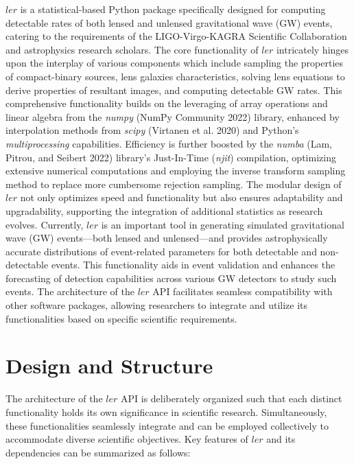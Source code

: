 \documentclass[10pt,a4paper,onecolumn]{article}
\begin{document}
\(ler\) is a statistical-based Python package specifically designed for
computing detectable rates of both lensed and unlensed gravitational
wave (GW) events, catering to the requirements of the LIGO-Virgo-KAGRA
Scientific Collaboration and astrophysics research scholars. The core
functionality of \(ler\) intricately hinges upon the interplay of
various components which include sampling the properties of
compact-binary sources, lens galaxies characteristics, solving lens
equations to derive properties of resultant images, and computing
detectable GW rates. This comprehensive functionality builds on the
leveraging of array operations and linear algebra from the \emph{numpy}
(NumPy Community 2022) library, enhanced by interpolation methods from
\emph{scipy} (Virtanen et al. 2020) and Python's \emph{multiprocessing}
capabilities. Efficiency is further boosted by the \emph{numba} (Lam,
Pitrou, and Seibert 2022) library's Just-In-Time (\emph{njit})
compilation, optimizing extensive numerical computations and employing
the inverse transform sampling method to replace more cumbersome
rejection sampling. The modular design of \(ler\) not only optimizes
speed and functionality but also ensures adaptability and upgradability,
supporting the integration of additional statistics as research evolves.
Currently, \(ler\) is an important tool in generating simulated
gravitational wave (GW) events---both lensed and unlensed---and provides
astrophysically accurate distributions of event-related parameters for
both detectable and non-detectable events. This functionality aids in
event validation and enhances the forecasting of detection capabilities
across various GW detectors to study such events. The architecture of
the \(ler\) API facilitates seamless compatibility with other software
packages, allowing researchers to integrate and utilize its
functionalities based on specific scientific requirements.

\section{Design and Structure}\label{design-and-structure}

The architecture of the \(ler\) API is deliberately organized such that
each distinct functionality holds its own significance in scientific
research. Simultaneously, these functionalities seamlessly integrate and
can be employed collectively to accommodate diverse scientific
objectives. Key features of \(ler\) and its dependencies can be
summarized as follows:
\end{document}
